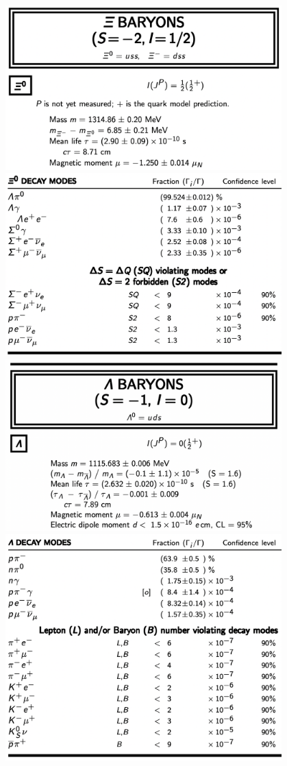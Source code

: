 \documentclass[txfonts]{NSTexam}
\begin{document}
\begin{questions}
\begin{center}
\includegraphics[width=0.8\textwidth]{PDG/XI_BARYONS.png}
\includegraphics[width=0.8\textwidth]{PDG/XI_DECAY_MODES.png}
\includegraphics[width=0.8\textwidth]{PDG/LAMBDA_BARYONS.png}
\includegraphics[width=0.8\textwidth]{PDG/LAMBDA_DECAY_MODES.png}
\end{center}

\end{questions}

\endofpaper
\end{document}
